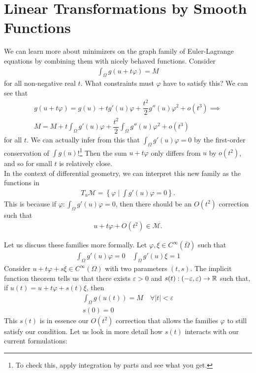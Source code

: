 \documentclass{memoir}
\begin{document}
\section{Linear Transformations by Smooth Functions}
\label{sec:linear_transformations_by_smooth_functions}

We can learn more about minimizers on the graph family of Euler-Lagrange equations by combining them with nicely behaved functions. Consider
\begin{align*}
	\int_\Omega g(u+t\varphi ) = M
\end{align*}
for all non-negative real \(t\). What constraints must \(\varphi \) have to satisfy this? We can see that
\begin{align*}
	g(u+t\varphi ) = g(u) + tg'(u)\varphi + \dfrac{t^2}{2}g''(u)\varphi^2 + o(t^3)\implies\\
	M = M+t \int_\Omega g'(u) \varphi  + \dfrac{t^2}{2}\int_\Omega g''(u)\varphi^2 + o(t^3)
\end{align*}
for all \(t\). We can actually infer from this that \(\int_\Omega g'(u) \varphi  = 0\) by the first-order conservation of \(\int g(u)\)!\footnote{To check this, apply integration by parts and see what you get.} Then the sum \(u+t\varphi \) only differs from \(u\) by \(o(t^2)\), and so for small \(t\) is relatively close.\\


In the context of differential geometry, we can interpret this new family as the functions in
\begin{align*}
	T_u\mathcal{M} = \left\{\varphi  \mid \int g'(u)\varphi  = 0 \right\} .
\end{align*}
This is because if \(\varphi :\int_{\Omega }g'(u)\varphi  = 0\), then there should be an \(O(t^2)\) correction such that
\begin{align*}
	u+t\varphi +O(t^2) \in \mathcal{M}.
\end{align*}

Let us discuss these families more formally. Let \(\varphi, \xi  \in C^{\infty}(\overline{\Omega })\) such that
\begin{align*}
	\int_\Omega g'(u)\varphi =0 \quad \int_\Omega  g'(u) \xi   = 1
\end{align*}
Consider \(u+t\varphi +s \xi  \in C^{\infty}(\Omega )\) with two parameters \((t,s)\). The implicit function theorem tells us that there exists \(\varepsilon>0\) and \(s(t):(-\varepsilon,\varepsilon)\to \mathbb{R}\) such that, if \(u(t) = u + t\varphi  + s(t) \xi  \), then
\begin{align*}
	\int_\Omega g(u(t)) = M \quad \forall \left| t \right| <\varepsilon\\
	s(0) = 0
\end{align*}
This \(s(t)\) is in essence our \(O(t^2)\) correction that allows the families \(\varphi \) to still satisfy our condition. Let us look in more detail how \(s(t)\) interacts with our current formulations:
\end{document}

